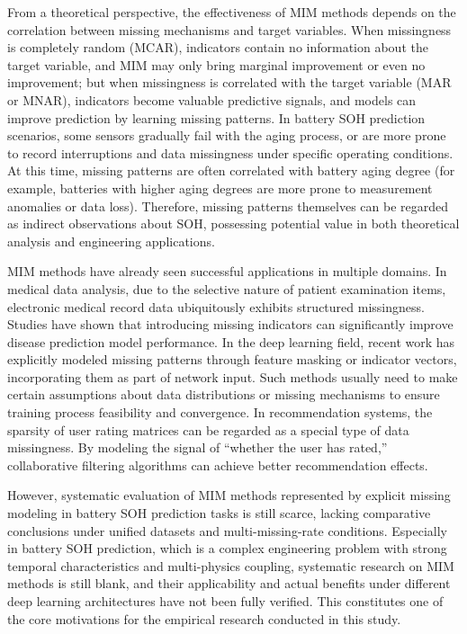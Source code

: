 \documentclass[10pt,a4paper]{article}
\begin{document}
From a theoretical perspective, the effectiveness of MIM methods depends on the correlation between missing mechanisms and target variables. When missingness is completely random (MCAR), indicators contain no information about the target variable, and MIM may only bring marginal improvement or even no improvement; but when missingness is correlated with the target variable (MAR or MNAR), indicators become valuable predictive signals, and models can improve prediction by learning missing patterns. In battery SOH prediction scenarios, some sensors gradually fail with the aging process, or are more prone to record interruptions and data missingness under specific operating conditions. At this time, missing patterns are often correlated with battery aging degree (for example, batteries with higher aging degrees are more prone to measurement anomalies or data loss). Therefore, missing patterns themselves can be regarded as indirect observations about SOH, possessing potential value in both theoretical analysis and engineering applications.

MIM methods have already seen successful applications in multiple domains. In medical data analysis, due to the selective nature of patient examination items, electronic medical record data ubiquitously exhibits structured missingness. Studies have shown that introducing missing indicators can significantly improve disease prediction model performance\cite{sisk2023imputation,ehrig2025imputation}. In the deep learning field, recent work has explicitly modeled missing patterns through feature masking or indicator vectors, incorporating them as part of network input\cite{ipsen2022deal,che2018recurrent}. Such methods usually need to make certain assumptions about data distributions or missing mechanisms to ensure training process feasibility and convergence. In recommendation systems, the sparsity of user rating matrices can be regarded as a special type of data missingness. By modeling the signal of ``whether the user has rated,'' collaborative filtering algorithms can achieve better recommendation effects.

However, systematic evaluation of MIM methods represented by explicit missing modeling in battery SOH prediction tasks is still scarce, lacking comparative conclusions under unified datasets and multi-missing-rate conditions. Especially in battery SOH prediction, which is a complex engineering problem with strong temporal characteristics and multi-physics coupling, systematic research on MIM methods is still blank, and their applicability and actual benefits under different deep learning architectures have not been fully verified. This constitutes one of the core motivations for the empirical research conducted in this study.
\end{document}
